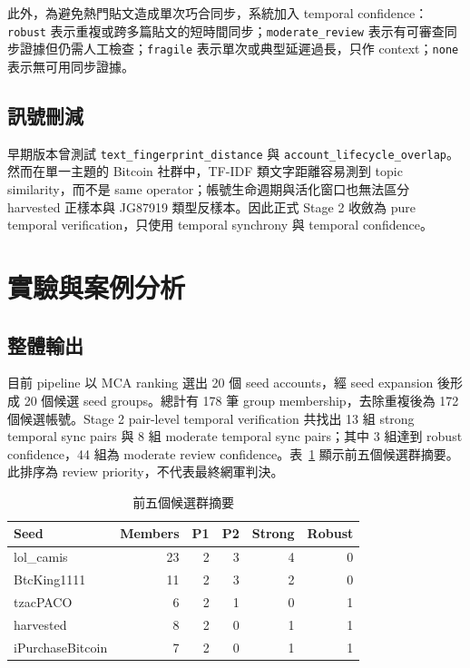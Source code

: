 \documentclass[conference]{IEEEtran}
\begin{document}
此外，為避免熱門貼文造成單次巧合同步，系統加入 temporal confidence：\texttt{robust} 表示重複或跨多篇貼文的短時間同步；\texttt{moderate\_review} 表示有可審查同步證據但仍需人工檢查；\texttt{fragile} 表示單次或典型延遲過長，只作 context；\texttt{none} 表示無可用同步證據。

\subsection{訊號刪減}

早期版本曾測試 \texttt{text\_fingerprint\_distance} 與 \texttt{account\_lifecycle\_overlap}。然而在單一主題的 Bitcoin 社群中，TF-IDF 類文字距離容易測到 topic similarity，而不是 same operator；帳號生命週期與活化窗口也無法區分 harvested 正樣本與 JG87919 類型反樣本。因此正式 Stage 2 收斂為 pure temporal verification，只使用 temporal synchrony 與 temporal confidence。

\section{實驗與案例分析}

\subsection{整體輸出}

目前 pipeline 以 MCA ranking 選出 20 個 seed accounts，經 seed expansion 後形成 20 個候選 seed groups。總計有 178 筆 group membership，去除重複後為 172 個候選帳號。Stage 2 pair-level temporal verification 共找出 13 組 strong temporal sync pairs 與 8 組 moderate temporal sync pairs；其中 3 組達到 robust confidence，44 組為 moderate review confidence。表~\ref{tab:top-groups} 顯示前五個候選群摘要。此排序為 review priority，不代表最終網軍判決。

\begin{table}[htbp]
\centering
\caption{前五個候選群摘要}
\label{tab:top-groups}
\small
\begin{tabular}{lrrrrr}
\toprule
Seed & Members & P1 & P2 & Strong & Robust \\
\midrule
lol\_camis & 23 & 2 & 3 & 4 & 0 \\
BtcKing1111 & 11 & 2 & 3 & 2 & 0 \\
tzacPACO & 6 & 2 & 1 & 0 & 1 \\
harvested & 8 & 2 & 0 & 1 & 1 \\
iPurchaseBitcoin & 7 & 2 & 0 & 1 & 1 \\
\bottomrule
\end{tabular}
\end{table}
\end{document}
